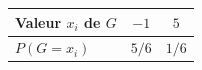 \begingroup\renewcommand{\arraystretch}{1.35}
\begin{tabular}{@{}lcc@{}}\toprule
Valeur $x_i$ de $G$ & $-1$ & $5$\\\midrule
$P(G=x_i)$ & $5/6$ & $1/6$\\
\bottomrule\end{tabular}\endgroup

\par\smallskip{}
